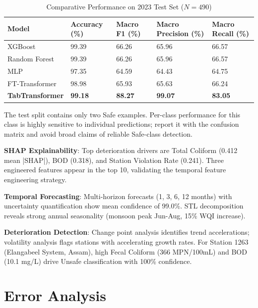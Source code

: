 \documentclass[12pt,a4paper]{report}
\numberwithin{table}{chapter}
\numberwithin{figure}{chapter}
\begin{document}
\begin{table}[ht]
\caption{Comparative Performance on 2023 Test Set ($N=490$)}
\label{tab:modelcomp}
\centering
\small
\begin{tabular}{@{} L{3.5cm} C{2.0cm} C{2.0cm} C{2.2cm} C{2.0cm} @{}}
\toprule
\textbf{Model} & \textbf{Accuracy (\%)} & \textbf{Macro F1 (\%)} & \textbf{Macro Precision (\%)} & \textbf{Macro Recall (\%)} \\
\midrule
XGBoost & 99.39 & 66.26 & 65.96 & 66.57 \\
Random Forest & 99.39 & 66.26 & 65.96 & 66.57 \\
MLP & 97.35 & 64.59 & 64.43 & 64.75 \\
FT-Transformer & 98.98 & 65.93 & 65.63 & 66.24 \\
\textbf{TabTransformer} & \textbf{99.18} & \textbf{88.27} & \textbf{99.07} & \textbf{83.05} \\
\bottomrule
\end{tabular}
\end{table}

The test split contains only two Safe examples. Per-class performance for this class
is highly sensitive to individual predictions; report it with the confusion matrix and
avoid broad claims of reliable Safe-class detection.

\textbf{SHAP Explainability}: Top deterioration drivers are Total Coliform (0.412 mean
|SHAP|), BOD (0.318), and Station Violation Rate (0.241). Three engineered features
appear in the top 10, validating the temporal feature engineering strategy.

\textbf{Temporal Forecasting}: Multi-horizon forecasts (1, 3, 6, 12 months) with
uncertainty quantification show mean confidence of 99.0\%. STL decomposition reveals
strong annual seasonality (monsoon peak Jun-Aug, 15\% WQI increase).

\textbf{Deterioration Detection}: Change point analysis identifies trend accelerations;
volatility analysis flags stations with accelerating growth rates. For Station 1263
(Elangabeel System, Assam), high Fecal Coliform (366 MPN/100mL) and BOD (10.1 mg/L)
drive Unsafe classification with 100\% confidence.

\section{Error Analysis}
\end{document}
